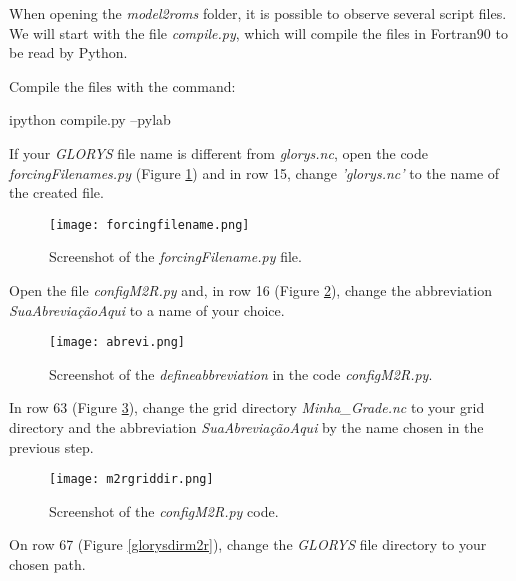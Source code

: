 When opening the \textit{model2roms} folder, it is possible to observe several script files. 
We will start with the file \textit{compile.py}, which will compile the files in Fortran90 to be read by Python. 
\bigskip

Compile the files with the command:
\bigskip

\begin{bashcode}
ipython compile.py --pylab
\end{bashcode}
\bigskip

If your \textit{GLORYS} file name is different from \textit{glorys.nc}, open the code \textit{forcingFilenames.py} 
(Figure \textcolor{bleu_cite}{\ref{forcingfilename}}) and in row 15, change \textit{'glorys.nc'} to the name of the created file.
\bigskip

\bigskip

\begin{figure}[H]
    \centering
    \texttt{[image: forcingfilename.png]}
    \caption{Screenshot of the \textit{forcingFilename.py} file.}
    \label{forcingfilename}
\end{figure}
\bigskip

Open the file \textit{configM2R.py} and, in row 16 (Figure \textcolor{bleu_cite}{\ref{abrev}}), change the abbreviation \textit{SuaAbreviaçãoAqui} 
to a name of your choice.
\bigskip

\begin{figure}[H]
    \centering
    \texttt{[image: abrevi.png]}
    \caption{Screenshot of the \textit{defineabbreviation} in the code \textit{configM2R.py}.}
    \label{abrev}
\end{figure}
\bigskip

In row 63 (Figure \textcolor{bleu_cite}{\ref{gradediretoriom2r}}), change the grid directory \textit{Minha\_Grade.nc} to your 
grid directory and the abbreviation \textit{SuaAbreviaçãoAqui} by the name chosen in the previous step.
\bigskip

\begin{figure}[H]
    \centering
    \texttt{[image: m2rgriddir.png]}
    \caption{Screenshot of the \textit{configM2R.py} code.
    }
    \label{gradediretoriom2r}
\end{figure}
\bigskip

On row 67 (Figure \textcolor{bleu_cite}{\ref{glorysdirm2r}}), change the \textit{GLORYS} file directory to your chosen path.
\bigskip

